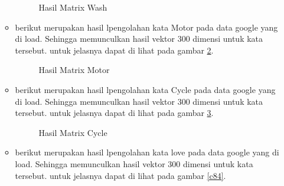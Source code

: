 \begin{enumerate}
\begin{itemize}
\begin{figure}[!htbp]
      \caption{Hasil Matrix Wash}
      \label{c81}
      \end{figure}

\item berikut merupakan hasil lpengolahan kata Motor pada data google yang di load. Sehingga memunculkan hasil vektor 300 dimensi untuk kata tersebut. untuk jelasnya dapat di lihat pada gambar \ref{c82}.

\begin{figure}[!htbp]
      \caption{Hasil Matrix Motor}
      \label{c82}
      \end{figure}

\item berikut merupakan hasil lpengolahan kata Cycle pada data google yang di load. Sehingga memunculkan hasil vektor 300 dimensi untuk kata tersebut. untuk jelasnya dapat di lihat pada gambar \ref{c83}.

\begin{figure}[!htbp]
      \caption{Hasil Matrix Cycle}
      \label{c83}
      \end{figure}

\item berikut merupakan hasil lpengolahan kata love pada data google yang di load. Sehingga memunculkan hasil vektor 300 dimensi untuk kata tersebut. untuk jelasnya dapat di lihat pada gambar \ref{c84}.


\end{itemize}
\end{enumerate}
